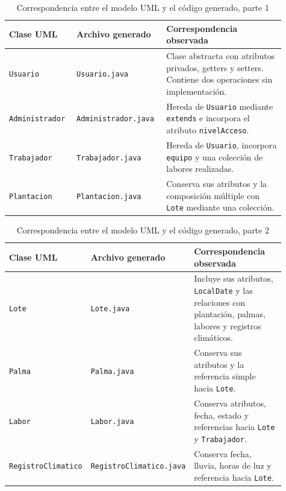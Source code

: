 \documentclass[11pt,a4paper]{article}
\begin{document}
\begin{table}[htbp]
\centering
\small
\caption{Correspondencia entre el modelo UML y el código generado, parte 1}
\begin{tabular}{|p{0.22\linewidth}|p{0.28\linewidth}|p{0.41\linewidth}|}
\hline
\textbf{Clase UML} & \textbf{Archivo generado} & \textbf{Correspondencia observada} \\
\hline
\texttt{Usuario} & \texttt{Usuario.java} & Clase abstracta con atributos privados, getters y setters. Contiene dos operaciones sin implementación. \\
\hline
\texttt{Administrador} & \texttt{Administrador.java} & Hereda de \texttt{Usuario} mediante \texttt{extends} e incorpora el atributo \texttt{nivelAcceso}. \\
\hline
\texttt{Trabajador} & \texttt{Trabajador.java} & Hereda de \texttt{Usuario}, incorpora \texttt{equipo} y una colección de labores realizadas. \\
\hline
\texttt{Plantacion} & \texttt{Plantacion.java} & Conserva sus atributos y la composición múltiple con \texttt{Lote} mediante una colección. \\
\hline
\end{tabular}
\end{table}

\begin{table}[htbp]
\centering
\small
\caption{Correspondencia entre el modelo UML y el código generado, parte 2}
\begin{tabular}{|p{0.22\linewidth}|p{0.28\linewidth}|p{0.41\linewidth}|}
\hline
\textbf{Clase UML} & \textbf{Archivo generado} & \textbf{Correspondencia observada} \\
\hline
\texttt{Lote} & \texttt{Lote.java} & Incluye sus atributos, \texttt{LocalDate} y las relaciones con plantación, palmas, labores y registros climáticos. \\
\hline
\texttt{Palma} & \texttt{Palma.java} & Conserva sus atributos y la referencia simple hacia \texttt{Lote}. \\
\hline
\texttt{Labor} & \texttt{Labor.java} & Conserva atributos, fecha, estado y referencias hacia \texttt{Lote} y \texttt{Trabajador}. \\
\hline
\texttt{RegistroClimatico} & \texttt{RegistroClimatico.java} & Conserva fecha, lluvia, horas de luz y referencia hacia \texttt{Lote}. \\
\hline
\end{tabular}
\end{table}
\end{document}
